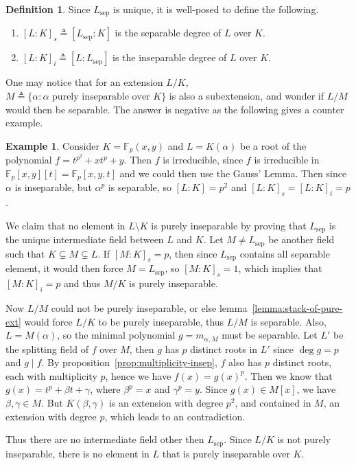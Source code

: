 \documentclass[a4paper]{article}
\newcommand{\defeq}{\triangleq}
\newcommand{\Fb}{\mathbb{F}}
\theoremstyle{remark}
\theoremstyle{definition}
\newtheorem{example}{Example}
\theoremstyle{definition}
\newtheorem{definition}{Definition}
\theoremstyle{plain}
\begin{document}
  \begin{definition}
    Since $L_\text{sep}$ is unique, it is well-posed to define the following.
    \begin{enumerate}
      \item $[L: K]_s \defeq [L_\text{sep} : K]$ is the separable degree of $L$ over $K$.
      \item $[L: K]_i \defeq [L : L_\text{sep}]$ is the inseparable degree of $L$ over $K$.
    \end{enumerate}
  \end{definition}

  One may notice that for an extension $L/K$, $M \defeq \{ \alpha : \alpha \text{ purely inseparable over } K\}$
  is also a subextension, and wonder if $L/M$ would then be separable. The answer is negative as
  the following gives a counter example.

  \begin{example}
    Consider $K = \Fb_p(x, y)$ and $L = K(\alpha)$ be a root of the polynomial $f = t^{p^2} + x t^p + y$.
    Then $f$ is irreducible, since $f$ is irreducible in $\Fb_p[x, y][t] = \Fb_p[x, y, t]$ and
    we could then use the Gauss' Lemma. Then since $\alpha$ is inseparable, but $\alpha^p$
    is separable, so $[L: K] = p^2$ and $[L: K]_s = [L: K]_i = p$.

    We claim that no element in $L \setminus K$ is purely inseparable by
    proving that $L_\text{sep}$ is the unique intermediate field between $L$ and $K$.
    Let $M \neq L_\text{sep}$ be another field such that $K \subsetneq M \subsetneq L$. If $[M: K]_s = p$,
    then since $L_\text{sep}$ contains all separable element, it would then force $M = L_\text{sep}$,
    so $[M: K]_s = 1$, which implies that $[M: K]_i = p$ and thus $M/K$ is purely inseparable.

    Now $L/M$ could not be purely inseparable, or else lemma~\ref{lemma:stack-of-pure-ext} would
    force $L/K$ to be purely inseparable, thus $L/M$ is separable. Also, $L = M(\alpha)$,
    so the minimal polynomial $g = m_{\alpha, M}$ must be separable. Let $L'$ be the splitting
    field of $f$ over $M$, then $g$ has $p$ distinct roots in $L'$ since $\deg g = p$ and $g \mid f$.
    By proposition~\ref{prop:multiplicity-insep}, $f$ also has $p$ distinct roots, each with multiplicity
    $p$, hence we have $f(x) = g(x)^p$. Then we know that $g(x) = t^p + \beta t + \gamma$, where
    $\beta^p = x$ and $\gamma^p = y$. Since $g(x) \in M[x]$, we have $\beta, \gamma \in M$.
    But $K(\beta, \gamma)$ is an extension with degree $p^2$, and contained in $M$,
    an extension with degree $p$, which leads to an contradiction.

    Thus there are no intermediate field other then $L_\text{sep}$. Since $L/K$ is not purely
    inseparable, there is no element in $L$ that is purely inseparable over $K$.
  \end{example}
\end{document}
